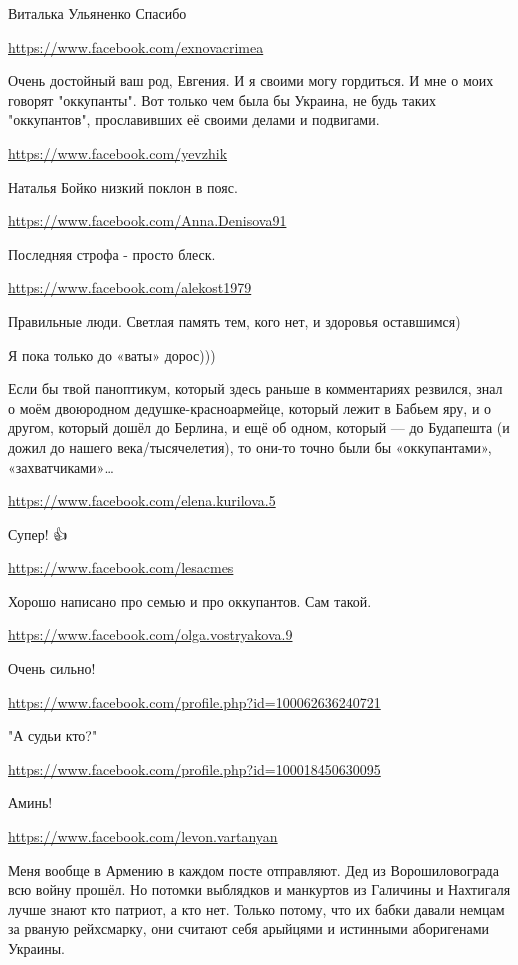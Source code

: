 \documentclass[a4paper,11pt]{extreport}
\begin{document}
\begin{itemize}
\begin{itemize}
Виталька Ульяненко Спасибо

\end{itemize}
\url{https://www.facebook.com/exnovacrimea}

Очень достойный ваш род, Евгения. И я своими могу гордиться. И мне о моих говорят "оккупанты". Вот только чем была бы Украина, не будь таких "оккупантов", прославивших её своими делами и подвигами.

\begin{itemize}
\url{https://www.facebook.com/yevzhik}

Наталья Бойко низкий поклон в пояс.

\end{itemize}
\url{https://www.facebook.com/Anna.Denisova91}

Последняя строфа - просто блеск.

\url{https://www.facebook.com/alekost1979}

Правильные люди. Светлая память тем, кого нет, и здоровья оставшимся)

Я пока только до «ваты» дорос)))

Если бы твой паноптикум, который здесь раньше в комментариях резвился, знал о моём двоюродном дедушке-красноармейце, который лежит в Бабьем яру, и о другом, который дошёл до Берлина, и ещё об одном, который — до Будапешта (и дожил до нашего века/тысячелетия), то они-то точно были бы «оккупантами», «захватчиками»…

\url{https://www.facebook.com/elena.kurilova.5}

Супер! 👍

\url{https://www.facebook.com/lesacmes}

Хорошо написано про семью и про оккупантов. Сам такой.

\url{https://www.facebook.com/olga.vostryakova.9}

Очень сильно!

\url{https://www.facebook.com/profile.php?id=100062636240721}

"А судьи кто?"

\url{https://www.facebook.com/profile.php?id=100018450630095}

Аминь!

\url{https://www.facebook.com/levon.vartanyan}

Меня вообще в Армению в каждом посте отправляют. Дед из Ворошиловограда всю войну прошёл. Но потомки выблядков и манкуртов из Галичины и Нахтигаля лучше знают кто патриот, а кто нет. Только потому, что их бабки давали немцам за рваную рейхсмарку, они считают себя арыйцями и истинными аборигенами Украины.


\end{itemize}
\end{document}

